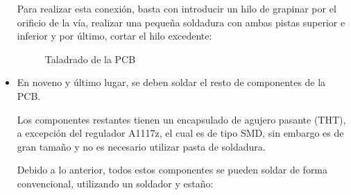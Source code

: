 \begin{itemize}
    Para realizar esta conexión, basta con introducir un hilo de grapinar por el orificio de la vía, realizar una pequeña soldadura con ambas pistas superior e inferior y por último, cortar el hilo excedente:
    
    \begin{figure}[H]
    \centering
    \caption{Taladrado de la PCB}
    \label{fig:lego}
    \end{figure}
    
    
    \item En noveno y último lugar, se deben soldar el resto de componentes de la PCB.
    
    Los componentes restantes tienen un encapsulado de agujero pasante (THT), a excepción del regulador A1117z, el cual es de tipo SMD, sin embargo es de gran tamaño y no es necesario utilizar pasta de soldadura.
    
    Debido a lo anterior, todos estos componentes se pueden soldar de forma convencional, utilizando un soldador y estaño:
    

\end{itemize}
